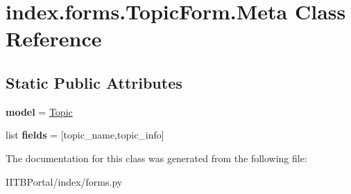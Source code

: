 \hypertarget{classindex_1_1forms_1_1TopicForm_1_1Meta}{}\section{index.\+forms.\+Topic\+Form.\+Meta Class Reference}
\label{classindex_1_1forms_1_1TopicForm_1_1Meta}
\subsection*{Static Public Attributes}
\begin{DoxyCompactItemize}
\item 
\mbox{\label{classindex_1_1forms_1_1TopicForm_1_1Meta_abf234bfc6315474c2cf08d295d1f1022}} 
{\bfseries model} = \hyperlink{classindex_1_1models_1_1Topic}{Topic}
\item 
\mbox{\label{classindex_1_1forms_1_1TopicForm_1_1Meta_a6ff1fbe9bce925d35b4df5cf721a162d}} 
list {\bfseries fields} = \mbox{[}\textquotesingle{}topic\+\_\+name\textquotesingle{},\textquotesingle{}topic\+\_\+info\textquotesingle{}\mbox{]}
\end{DoxyCompactItemize}


The documentation for this class was generated from the following file\+:\begin{DoxyCompactItemize}
\item 
I\+I\+T\+B\+Portal/index/forms.\+py\end{DoxyCompactItemize}
